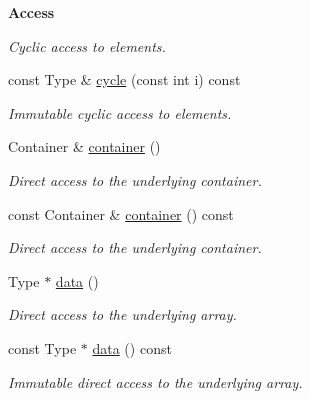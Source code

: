 \begin{Indent}{\bf Access}
\begin{DoxyCompactItemize}
\begin{DoxyCompactList}\small\item\em Cyclic access to elements. \end{DoxyCompactList}\item 
const Type \& \hyperlink{exceptionmagrathea_1_1Evolution_a0d85c514151bdea5cde2f356f1b5fced}{cycle} (const int i) const 
\begin{DoxyCompactList}\small\item\em Immutable cyclic access to elements. \end{DoxyCompactList}\item 
Container \& \hyperlink{exceptionmagrathea_1_1Evolution_a386a62b18d45914dc843d09b3d52a711}{container} ()
\begin{DoxyCompactList}\small\item\em Direct access to the underlying container. \end{DoxyCompactList}\item 
const Container \& \hyperlink{exceptionmagrathea_1_1Evolution_ade02e0a4d08e6e1e4ac198e0aedcffc8}{container} () const 
\begin{DoxyCompactList}\small\item\em Direct access to the underlying container. \end{DoxyCompactList}\item 
Type $\ast$ \hyperlink{exceptionmagrathea_1_1Evolution_addbc520a73910030f30b84dca749de5e}{data} ()
\begin{DoxyCompactList}\small\item\em Direct access to the underlying array. \end{DoxyCompactList}\item 
const Type $\ast$ \hyperlink{exceptionmagrathea_1_1Evolution_a183b4002b3505323e177bd44f6eb8301}{data} () const 
\begin{DoxyCompactList}\small\item\em Immutable direct access to the underlying array. \end{DoxyCompactList}\end{DoxyCompactItemize}
\end{Indent}
